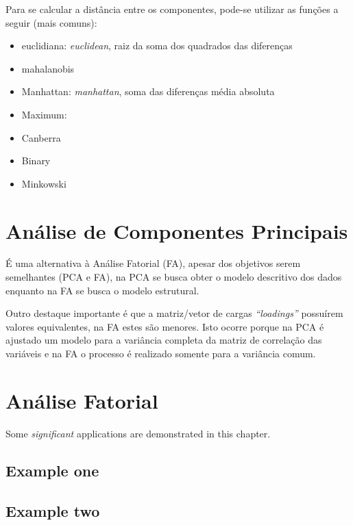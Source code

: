 \documentclass[]{book}
\providecommand{\tightlist}{%
  \setlength{\itemsep}{0pt}\setlength{\parskip}{0pt}}
\begin{document}
Para se calcular a distância entre os componentes, pode-se utilizar as
funções a seguir (mais comuns):

\begin{itemize}
\tightlist
\item
  euclidiana: \emph{euclidean}, raiz da soma dos quadrados das
  diferenças
\item
  mahalanobis
\item
  Manhattan: \emph{manhattan}, soma das diferenças média absoluta
\item
  Maximum:
\item
  Canberra
\item
  Binary
\item
  Minkowski
\end{itemize}

\chapter{Análise de Componentes Principais}\label{PCA}

É uma alternativa à Análise Fatorial (FA), apesar dos objetivos serem
semelhantes (PCA e FA), na PCA se busca obter o modelo descritivo dos
dados enquanto na FA se busca o modelo estrutural.

Outro destaque importante é que a matriz/vetor de cargas
\emph{``loadings''} possuírem valores equivalentes, na FA estes são
menores. Isto ocorre porque na PCA é ajustado um modelo para a variância
completa da matriz de correlação das variáveis e na FA o processo é
realizado somente para a variância comum.

\chapter{Análise Fatorial}\label{FA}

Some \emph{significant} applications are demonstrated in this chapter.

\section{Example one}\label{example-one}

\section{Example two}\label{example-two}


\end{document}
